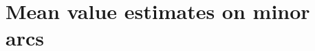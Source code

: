 \documentclass{amsart}%
\numberwithin{equation}{section}
\newtheorem{lemma}[theorem]{Lemma}
\theoremstyle{remark}
\newcommand{\1}{\mathbbm{1}}
\begin{document}








 
 \section{Mean value estimates on minor arcs}\label{sec2}
 
\end{document}
